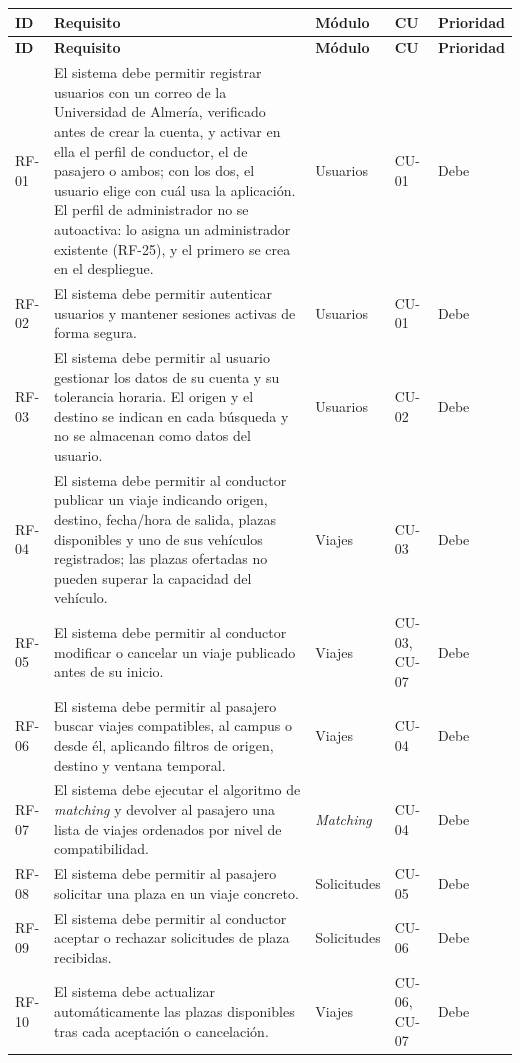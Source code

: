   \begin{longtable}{p{1.2cm} p{7.0cm} p{2.7cm} p{1.3cm} p{1.6cm}}
  \hline
  \textbf{ID} & \textbf{Requisito} & \textbf{Módulo} & \textbf{CU} & \textbf{Prioridad} \\
  \hline
  \endfirsthead
  \hline
  \textbf{ID} & \textbf{Requisito} & \textbf{Módulo} & \textbf{CU} & \textbf{Prioridad} \\
  \hline
  \endhead
  RF-01 & El sistema debe permitir registrar usuarios con un correo de la Universidad de Almería, verificado antes de crear la cuenta, y activar en ella el perfil de conductor, el de pasajero o ambos; con los dos, el usuario elige con cuál usa la aplicación. El perfil de administrador no se autoactiva: lo asigna un administrador existente (RF-25), y el primero se crea en el despliegue. & Usuarios & CU-01 & Debe \\
  RF-02 & El sistema debe permitir autenticar usuarios y mantener sesiones activas de forma segura. & Usuarios & CU-01 & Debe \\
  RF-03 & El sistema debe permitir al usuario gestionar los datos de su cuenta y su tolerancia horaria. El origen y el destino se indican en cada búsqueda y no se almacenan como datos del usuario. & Usuarios & CU-02 & Debe \\
  RF-04 & El sistema debe permitir al conductor publicar un viaje indicando origen, destino, fecha/hora de salida, plazas disponibles y uno de sus vehículos registrados; las plazas ofertadas no pueden superar la capacidad del vehículo. & Viajes & CU-03 & Debe \\
  RF-05 & El sistema debe permitir al conductor modificar o cancelar un viaje publicado antes de su inicio. & Viajes & CU-03, CU-07 & Debe \\
  RF-06 & El sistema debe permitir al pasajero buscar viajes compatibles, al campus o desde él, aplicando filtros de origen, destino y ventana temporal. & Viajes & CU-04 & Debe \\
  RF-07 & El sistema debe ejecutar el algoritmo de \textit{matching} y devolver al pasajero una lista de viajes ordenados por nivel de compatibilidad. & \textit{Matching} & CU-04 & Debe \\
  RF-08 & El sistema debe permitir al pasajero solicitar una plaza en un viaje concreto. & Solicitudes & CU-05 & Debe \\
  RF-09 & El sistema debe permitir al conductor aceptar o rechazar solicitudes de plaza recibidas. & Solicitudes & CU-06 & Debe \\
  RF-10 & El sistema debe actualizar automáticamente las plazas disponibles tras cada aceptación o cancelación. & Viajes & CU-06, CU-07 & Debe \\

\end{longtable}
